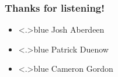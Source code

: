 \documentclass[handout,english]{beamer}
\newcommand{\cmark}{\ding{51}}%
\newcommand{\xmark}{\ding{55}}%
\begin{document}
%
%

\begin{frame}
\frametitle{Thanks for listening!}

\begin{itemize}
\item<+-|alert@+>{\color<.>{blue}
        Josh Aberdeen
        }
\item<+-|alert@+>{\color<.>{blue}
        Patrick Duenow
        }
\item<+-|alert@+>{\color<.>{blue}
        Cameron Gordon
        }

\end{itemize}

\vfill\end{frame}


\end{document}
